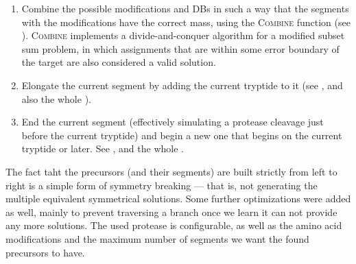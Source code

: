 \begin{enumerate}
	\item Combine the possible modifications and DBs in such a way that the  segments with the modifications have the correct mass, using the \textsc{Combine} function (see ). \textsc{Combine} implements a divide-and-conquer algorithm for a modified subset sum problem, in which assignments that are within some error boundary of the target are also considered a valid solution.
	\item Elongate the current segment by adding the current tryptide to it (see , and also the whole ).
	\item End the current segment (effectively simulating a protease cleavage just before the current tryptide) and begin a new one that begins on the current tryptide or later. See , and the whole .
\end{enumerate}

The fact taht the precursors (and their segments) are built strictly from left to right is a simple form of symmetry breaking --- that is, not generating the multiple equivalent symmetrical solutions. Some further optimizations were added as well, mainly to prevent traversing a branch once we learn it can not provide any more solutions. The used protease is configurable, as well as the amino acid modifications and the maximum number of segments we want the found precursors to have.



